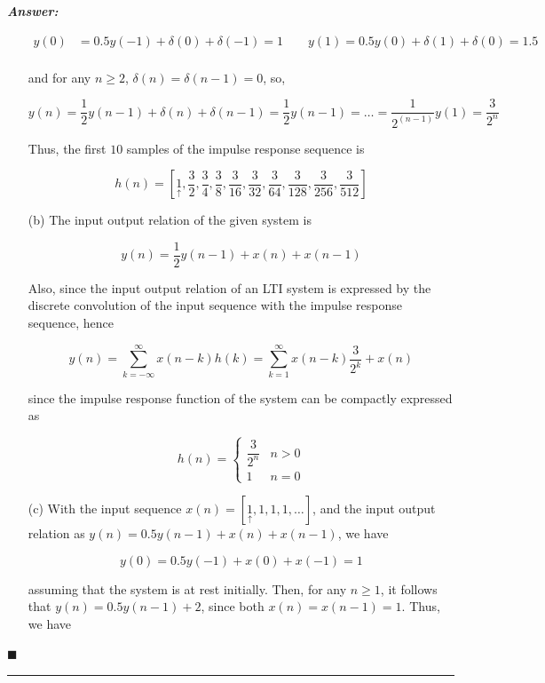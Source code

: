 \documentclass[12pt]{article}
\theoremstyle{definition}
\newenvironment{answer}{
    \textbf{\textit{Answer:}} \qquad
}{\hfill $\blacksquare$ \\ 

\begin{center}
    \rule{0.8\linewidth}{1.5px} 
    \vspace*{1cm}   
\end{center}
}
\begin{document}
\begin{answer}
\begin{enumerate}
        \begin{align*}
            y(0) & = 0.5 y(-1) + \delta(0) + \delta(-1) = 1
            \qquad y(1) = 0.5 y(0) + \delta(1) + \delta(0) = 1.5\\
        \end{align*}

        and for any $n \geq 2$, $\delta(n) = \delta(n-1) = 0$, so,

        $$
        y(n) = \dfrac{1}{2}y(n-1) + \delta(n) + \delta(n-1) = \dfrac{1}{2}y(n-1) = \dots = \dfrac{1}{2^(n-1)} y(1) = \dfrac{3}{2^n} 
        $$

        Thus, the first $10$ samples of the impulse response sequence is 

        $$
        h(n) = \left[ \underset{\uparrow}{1}, \dfrac{3}{2}, \dfrac{3}{4}, \dfrac{3}{8}, \dfrac{3}{16}, \dfrac{3}{32}, \dfrac{3}{64}, \dfrac{3}{128}, \dfrac{3}{256}, \dfrac{3}{512} \right]
        $$

        \item[(b)] The input output relation of the given system is 

        $$
        y(n) = \dfrac{1}{2} y(n-1) + x(n) + x(n-1)
        $$

        Also, since the input output relation of an LTI system is expressed by the discrete convolution of the input sequence with the impulse response sequence, hence

        $$
        y(n) = \sum_{k = -\infty}^\infty x(n-k) h(k) = \sum_{k = 1}^\infty x(n-k) \dfrac{3}{2^{k}} + x(n)
        $$

        since the impulse response function of the system can be compactly expressed as 

        $$
        h(n) = \begin{cases}
            \dfrac{3}{2^n} & n > 0\\
            1 & n = 0
        \end{cases}
        $$

        \item[(c)] With the input sequence $x(n) = [\underset{\uparrow}{1}, 1, 1, 1, \dots]$, and the input output relation as $y(n) = 0.5y(n-1) + x(n) + x(n-1)$, we have 
        
        $$
        y(0) = 0.5 y(-1) + x(0) + x(-1) = 1
        $$

        assuming that the system is at rest initially. Then, for any $n \geq 1$, it follows that $y(n) = 0.5 y(n-1) + 2$, since both $x(n) = x(n-1) = 1$. Thus, we have 


\end{enumerate}
\end{answer}
\end{document}
